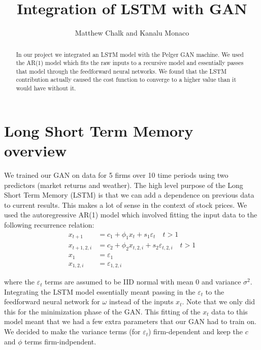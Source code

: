 \documentclass[10pt]{article}
\begin{document}
\title{Integration of LSTM with GAN}
\author{Matthew Chalk and Kanalu Monaco}
\maketitle

\begin{abstract}
    In our project we integrated an LSTM model with the Pelger GAN machine. We used the AR(1) model which fits the raw inputs to a recursive model and essentially passes that model through the feedforward neural networks. We found that the LSTM contribution actually caused the cost function to converge to a higher value than it would have without it.
\end{abstract}

\section{Long Short Term Memory overview}

We trained our GAN on data for 5 firms over 10 time periods using two predictors (market returns and weather). The high level purpose of the Long Short Term Memory (LSTM) is that we can add a dependence on previous data to current results. This makes a lot of sense in the context of stock prices. We used the autoregressive AR(1) model which involved fitting the input data to the following recurrence relation:
\begin{align}
    x_{t+1} & =c_1+\phi_1 x_t+s_1\varepsilon_t \quad t>1\\
    x_{t+1, 2, i} & =c_2+\phi_2 x_{t,2,i}+s_2\varepsilon_{t,2,i} \quad t>1\\
    x_{1} & =\varepsilon_1\\
    x_{1,2,i} & =\varepsilon_{1,2,i}
\end{align}

where the \(\varepsilon_t\) terms are assumed to be IID normal with mean 0 and variance \(\sigma^2\). Integrating the LSTM model essentially meant passing in the \(\varepsilon_t\) to the feedforward neural network for \(\omega\) instead of the inputs \(x_t\). Note that we only did this for the minimization phase of the GAN. This fitting of the \(x_t\) data to this model meant that we had a few extra parameters that our GAN had to train on. We decided to make the variance terms (for \(\varepsilon_t\)) firm-dependent and keep the \(c\) and \(\phi\) terms firm-indpendent.
\end{document}
